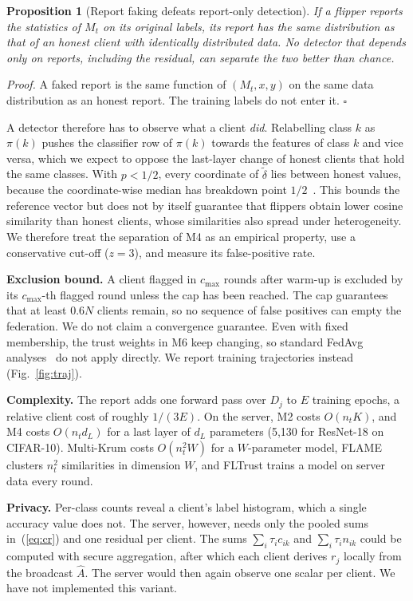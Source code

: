 \documentclass[conference]{IEEEtran}
\newtheorem{proposition}{Proposition}
\begin{document}
\begin{proposition}[Report faking defeats report-only detection]\label{prop:faking}
If a flipper reports the statistics of $M_t$ on its original labels, its report has the same distribution as that of an honest client with identically distributed data. No detector that depends only on reports, including the residual, can separate the two better than chance.
\end{proposition}
\emph{Proof.} A faked report is the same function of $(M_t,x,y)$ on the same data distribution as an honest report. The training labels do not enter it. \hfill$\square$

A detector therefore has to observe what a client \emph{did}. Relabelling class $k$ as $\pi(k)$ pushes the classifier row of $\pi(k)$ towards the features of class $k$ and vice versa, which we expect to oppose the last-layer change of honest clients that hold the same classes. With $p<1/2$, every coordinate of $\tilde\delta$ lies between honest values, because the coordinate-wise median has breakdown point $1/2$~\cite{yin2018byzantine}. This bounds the reference vector but does not by itself guarantee that flippers obtain lower cosine similarity than honest clients, whose similarities also spread under heterogeneity. We therefore treat the separation of M4 as an empirical property, use a conservative cut-off ($z{=}3$), and measure its false-positive rate.

\textbf{Exclusion bound.} A client flagged in $c_{\max}$ rounds after warm-up is excluded by its $c_{\max}$-th flagged round unless the cap has been reached. The cap guarantees that at least $0.6N$ clients remain, so no sequence of false positives can empty the federation. We do not claim a convergence guarantee. Even with fixed membership, the trust weights in M6 keep changing, so standard FedAvg analyses~\cite{li2020convergence} do not apply directly. We report training trajectories instead (Fig.~\ref{fig:traj}).

\textbf{Complexity.} The report adds one forward pass over $D_j$ to $E$ training epochs, a relative client cost of roughly $1/(3E)$. On the server, M2 costs $O(n_tK)$, and M4 costs $O(n_t d_L)$ for a last layer of $d_L$ parameters (5{,}130 for ResNet-18 on CIFAR-10). Multi-Krum costs $O(n_t^2W)$ for a $W$-parameter model, FLAME clusters $n_t^2$ similarities in dimension $W$, and FLTrust trains a model on server data every round.

\textbf{Privacy.} Per-class counts reveal a client's label histogram, which a single accuracy value does not. The server, however, needs only the pooled sums in~(\ref{eq:cr}) and one residual per client. The sums $\sum_i\tau_ic_{ik}$ and $\sum_i\tau_in_{ik}$ could be computed with secure aggregation, after which each client derives $r_j$ locally from the broadcast $\hat A$. The server would then again observe one scalar per client. We have not implemented this variant.
\end{document}
